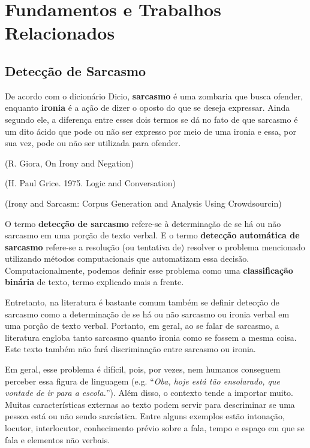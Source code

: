 

\chapter{Fundamentos e Trabalhos Relacionados}%
\label{cha:fundamentos_e_trabalhos_relacionados}

\section{Detecção de Sarcasmo}%
\label{sec:deteccao_de_sarcasmo}

De acordo com o dicionário Dicio, \textbf{sarcasmo} é uma zombaria que busca
ofender, enquanto \textbf{ironia} é a ação de dizer o oposto do que se deseja
expressar. Ainda segundo ele, a diferença entre esses dois termos se dá no fato
de que sarcasmo é um dito ácido que pode ou não ser expresso por meio de uma
ironia e essa, por sua vez, pode ou não ser utilizada para
ofender.~\cite{dicio_sarc, dicio_irony}

(R. Giora, On Irony and Negation)

(H. Paul Grice. 1975. Logic and Conversation)

(Irony and Sarcasm: Corpus Generation and Analysis Using Crowdsourcin)

O termo \textbf{detecção de sarcasmo} refere-se à determinação de se há ou não
sarcasmo em uma porção de texto verbal. E o termo \textbf{detecção automática de
sarcasmo} refere-se a resolução (ou tentativa de) resolver o problema mencionado
utilizando métodos computacionais que automatizam essa decisão.
Computacionalmente, podemos definir esse problema como uma \textbf{classificação
binária} de texto, termo explicado mais a frente.

Entretanto, na literatura é bastante comum também se definir detecção de
sarcasmo como a determinação de se há ou não sarcasmo ou ironia verbal em uma
porção de texto verbal. Portanto, em geral, ao se falar de sarcasmo, a
literatura engloba tanto sarcasmo quanto ironia como se fossem a mesma coisa.
Este texto também não fará discriminação entre sarcasmo ou ironia.

Em geral, esse problema é difícil, pois, por vezes, nem humanos conseguem
perceber essa figura de linguagem (e.g. ``\textit{Oba, hoje está tão ensolarado,
que vontade de ir para a escola.}''). Além disso, o contexto tende a importar
muito. Muitas características externas ao texto podem servir para descriminar se
uma pessoa está ou não sendo sarcástica. Entre alguns exemplos estão intonação,
locutor, interlocutor, conhecimento prévio sobre a fala, tempo e espaço em que
se fala e elementos não verbais.~\cite{wallace-etal:2014:ironic-context}

